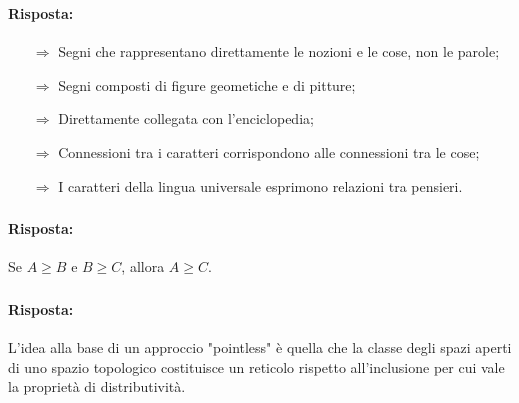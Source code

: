 \subsubsection{}


\paragraph{Risposta:}

\begin{itemize}
    \item [$\Rightarrow$] Segni che rappresentano direttamente le nozioni e le cose, non le parole;
    \item [$\Rightarrow$] Segni composti di figure geometiche e di pitture;
    \item [$\Rightarrow$] Direttamente collegata con l'enciclopedia;
    \item [$\Rightarrow$] Connessioni tra i caratteri corrispondono alle connessioni tra le cose;
    \item [$\Rightarrow$] I caratteri della lingua universale esprimono relazioni tra pensieri.
\end{itemize}

\subsubsection{}


\paragraph{Risposta:} Se $A \geq B$ e $B \geq C$, allora $A \geq C$.

\subsubsection{}


\paragraph{Risposta:} L'idea alla base di un approccio "pointless" è quella che la classe
degli spazi aperti di uno spazio topologico costituisce un reticolo rispetto all'inclusione
per cui vale la proprietà di distributività.

